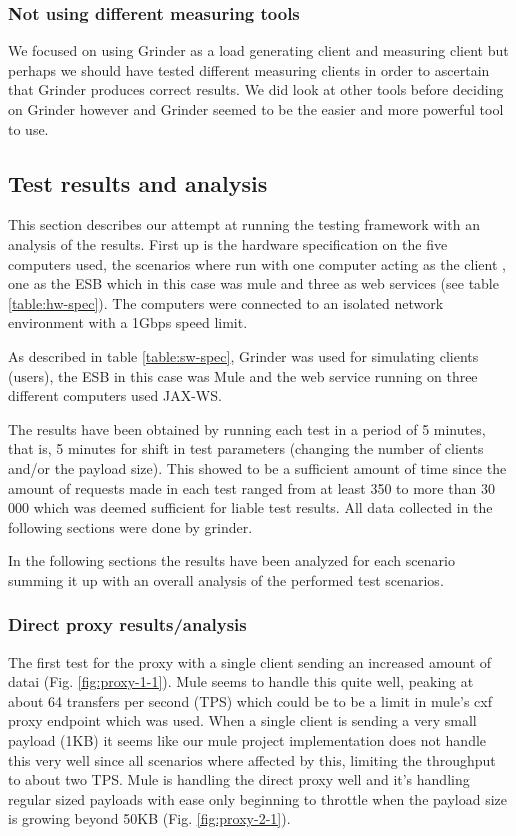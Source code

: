 \subsubsection{Not using different measuring tools}
We focused on using Grinder as a load generating client and measuring client but perhaps we should have tested different measuring clients in order to ascertain that Grinder produces correct results.
We did look at other tools before deciding on Grinder however and Grinder seemed to be the easier and more powerful tool to use.


\subsection{Test results and analysis}

This section describes our attempt at running the testing framework with an analysis of the results.
First up is the hardware specification on the five computers used, the scenarios where run with one computer acting as the client , one as the ESB which in this case was mule  and three as web services (see table \ref{table:hw-spec}). 
The computers were connected to an isolated network environment with a 1Gbps speed limit.

As described in table \ref{table:sw-spec}, Grinder was used for simulating clients (users), the ESB in this case was Mule and the web service running on three different computers used JAX-WS.

The results have been obtained by running each test in a period of 5 minutes, that is, 5 minutes for shift in test parameters (changing the number of clients and/or the payload size). 
This showed to be a sufficient amount of time since the amount of requests made in each test ranged from at least 350 to more than 30 000 which was deemed sufficient for liable test results. All data collected in the following sections were done by grinder.

In the following sections the results have been analyzed for each scenario summing it up with an overall analysis of the performed test scenarios.

\subsubsection{Direct proxy results/analysis}
\label{test:results}
The first test for the proxy with a single client sending an increased amount of datai (Fig. \ref{fig:proxy-1-1}). Mule seems to handle this quite well, peaking at about 64 transfers per second (TPS) which could be to be a limit in mule's cxf proxy endpoint which was used. When a single client is sending a very small payload (1KB) it seems like our mule project implementation does not handle this very well since all scenarios where affected by this, limiting the throughput to about two TPS. Mule is handling the direct proxy well and it's handling regular sized payloads with ease only beginning to throttle when the payload size is growing beyond 50KB (Fig. \ref{fig:proxy-2-1}).

